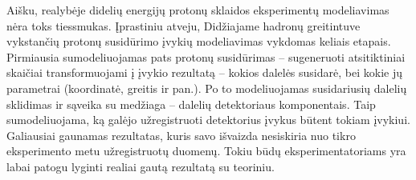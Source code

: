 \documentclass[a4paper, 12pt]{article}
\begin{document}
Aišku, realybėje didelių energijų protonų sklaidos eksperimentų modeliavimas nėra toks
tiessmukas.
Įprastiniu atveju, Didžiajame hadronų greitintuve vykstančių protonų susidūrimo įvykių
modeliavimas vykdomas keliais etapais.
Pirmiausia sumodeliuojamas pats protonų susidūrimas -- sugeneruoti atsitiktiniai skaičiai
transformuojami į įvykio rezultatą -- kokios dalelės susidarė, bei kokie jų parametrai
(koordinatė, greitis ir pan.).
Po to modeliuojamas susidariusių dalelių sklidimas ir sąveika su medžiaga -- dalelių
detektoriaus komponentais.
Taip sumodeliuojama, ką galėjo užregistruoti detektorius įvykus būtent tokiam įvykiui.
Galiausiai gaunamas rezultatas, kuris savo išvaizda nesiskiria nuo tikro eksperimento metu
užregistruotų duomenų.
Tokiu būdų eksperimentatoriams yra labai patogu lyginti realiai gautą rezultatą su teoriniu.
\end{document}
